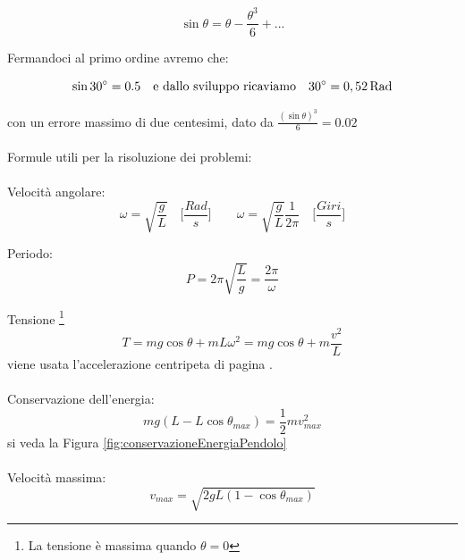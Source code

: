 \begin{equation*}
    \sin\theta = \theta - \frac{\theta^3}{6} + ...
\end{equation*}

Fermandoci al primo ordine avremo che:

\begin{equation*}
    \sin 30^\circ = 0.5 \quad\text{e dallo sviluppo ricaviamo}\quad 30^\circ  =  0,52 \,\text{Rad}
\end{equation*}

con un errore massimo di due centesimi, dato da $\frac{(\sin\theta)^3}{6} = 0.02$

\paragraph{}
Formule utili per la risoluzione dei problemi:
\paragraph{}
Velocità angolare:
\begin{equation}
    \omega = \sqrt{\frac{g}{L}}\quad \biggl[\frac{Rad}{s}\biggl]\qquad \omega = \sqrt{\frac{g}{L}}\frac{1}{2\pi}\quad \biggl[\frac{Giri}{s}\biggl]
\end{equation}

Periodo:
\begin{equation}
    P = 2\pi \sqrt{\frac{L}{g}} = \frac{2\pi}{\omega}
\end{equation}

Tensione \footnote{La tensione è massima quando $\theta = 0$}
\begin{equation}
    T = mg\cos\theta + mL\omega^2 = mg\cos\theta + m\frac{v^2}{L}
\end{equation}
viene usata l'accelerazione centripeta di pagina \pageref{AccelerazioneCentripeta}.
\paragraph{}
Conservazione dell'energia:
\begin{equation}
    mg(L-L\cos\theta_{max}) = \frac{1}{2}mv_{max}^2
\end{equation}
si veda la Figura \ref{fig:conservazioneEnergiaPendolo}
\paragraph{}
Velocità massima:
\begin{equation}
    v_{max} = \sqrt{2gL(1-\cos\theta_{max})}
\end{equation}

